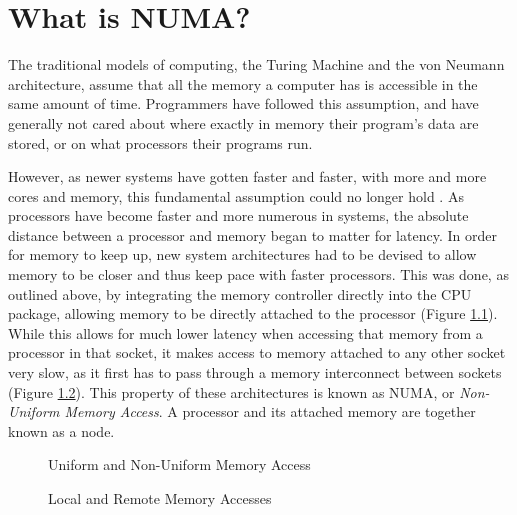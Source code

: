 \chapter{What is NUMA?}
\label{whatisnuma}
The traditional models of computing, the Turing Machine and the von Neumann architecture, 
assume that all the memory a computer has is accessible in the same amount of time. 
Programmers have followed this assumption, and have generally not cared about where exactly in memory their program's data are stored,
or on what processors their programs run.

However, as newer systems have gotten faster and faster, with more and more cores and memory, this fundamental assumption could no longer hold
\cite{lameter_numa_2013}.
As processors have become faster and more numerous in systems, the absolute distance between a processor and memory began to matter for latency.
In order for memory to keep up, new system architectures had to be devised to allow memory to be closer and thus keep pace with faster processors.
This was done, as outlined above, by integrating the memory controller directly into the CPU package, 
allowing memory to be directly attached to the processor (Figure \ref{fig:UMAvsNUMA}).
While this allows for much lower latency when accessing that memory from a processor in that socket, 
it makes access to memory attached to any other socket very slow, as it first has to pass through a memory interconnect between sockets (Figure \ref{fig:LocalvsRemote}).
This property of these architectures is known as NUMA, or \textit{Non-Uniform Memory Access}.
A processor and its attached memory are together known as a node.

\begin{figure}[H]
    \centering
    \resizebox{!}{0.25\textheight}{}
    \resizebox{!}{0.25\textheight}{}
    \captionsetup{width=0.8\linewidth}
    \caption{Uniform and Non-Uniform Memory Access}
    \label{fig:UMAvsNUMA}
\end{figure}

\begin{figure}[H]
    \centering
    \resizebox{!}{0.25\textheight}{}
    \resizebox{!}{0.25\textheight}{}
    \captionsetup{width=0.8\linewidth}
    \caption{Local and Remote Memory Accesses}
    \label{fig:LocalvsRemote}
\end{figure}

